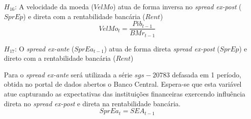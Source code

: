 \documentclass[12pt,12pt,openright,oneside,a4paper,chapter=TITLE,section=TITLE,subsection=TITLE,subsubsection=TITLE,english,french,spanish,portugues,sumario=tradicional]{abntex2}
\begin{document}
\(H_{16}\): A velocidade da moeda (\(VelMo\)) atua de forma inversa no \emph{spread ex-post} (\(SprEp\)) e direta com a rentabilidade bancária (\(Rent\))
\[
VelMo_{t} = \frac{Pib_{t-1}}{BMr_{t-1}}
\]

\(H_{17}\): O \emph{spread ex-ante} (\(SprEa_{t-1}\)) atua de forma direta \emph{spread ex-post} (\(SprEp\)) e direto com a rentabilidade bancária (\(Rent\))

Para o \emph{spread ex-ante} será utilizada a série \(sgs-20783\) defasada em 1 período, obtida no portal de dados abertos o Banco Central. Espera-se que esta variável atue capturando as expectativas das instituições financeiras exercendo influência direta no \emph{spread ex-post} e direta na rentabilidade bancária.
\[
SprEa_{t} = SEA_{t-1}
\]

\begin{table}[H]
\centering\begingroup\fontsize{10}{12}\selectfont


\end{table}
\end{document}
